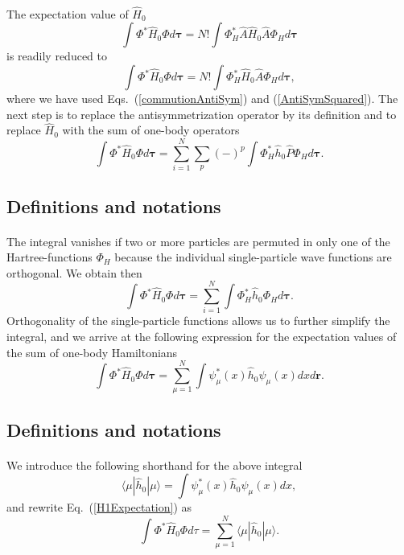 \documentclass[%
twoside,                 %
final,                   %
10pt]{article}
\begin{document}
\paragraph{}
The expectation value of $\hat{H}_0$ 
\[
  \int \Phi^*\hat{H}_0\Phi d\mathbf{\tau} 
  = N! \int \Phi_H^*\hat{A}\hat{H}_0\hat{A}\Phi_H d\mathbf{\tau}
\]
is readily reduced to
\[
  \int \Phi^*\hat{H}_0\Phi d\mathbf{\tau} 
  = N! \int \Phi_H^*\hat{H}_0\hat{A}\Phi_H d\mathbf{\tau},
\]
where we have used Eqs.~(\ref{commutionAntiSym}) and
(\ref{AntiSymSquared}). The next step is to replace the antisymmetrization
operator by its definition and to
replace $\hat{H}_0$ with the sum of one-body operators
\[
  \int \Phi^*\hat{H}_0\Phi  d\mathbf{\tau}
  = \sum_{i=1}^N \sum_{p} (-)^p\int 
  \Phi_H^*\hat{h}_0\hat{P}\Phi_H d\mathbf{\tau}.
\]



\subsection*{Definitions and notations}

\paragraph{}
The integral vanishes if two or more particles are permuted in only one
of the Hartree-functions $\Phi_H$ because the individual single-particle wave functions are
orthogonal. We obtain then
\[
  \int \Phi^*\hat{H}_0\Phi  d\mathbf{\tau}= \sum_{i=1}^N \int \Phi_H^*\hat{h}_0\Phi_H  d\mathbf{\tau}.
\]
Orthogonality of the single-particle functions allows us to further simplify the integral, and we
arrive at the following expression for the expectation values of the
sum of one-body Hamiltonians 
\begin{equation}
  \int \Phi^*\hat{H}_0\Phi  d\mathbf{\tau}
  = \sum_{\mu=1}^N \int \psi_{\mu}^*(x)\hat{h}_0\psi_{\mu}(x)dx
  d\mathbf{r}.
  \label{H1Expectation}
\end{equation}



\subsection*{Definitions and notations}

\paragraph{}
We introduce the following shorthand for the above integral
\[
\langle \mu | \hat{h}_0 | \mu \rangle = \int \psi_{\mu}^*(x)\hat{h}_0\psi_{\mu}(x)dx,
\]
and rewrite Eq.~(\ref{H1Expectation}) as
\begin{equation}
  \int \Phi^*\hat{H}_0\Phi  d\tau
  = \sum_{\mu=1}^N \langle \mu | \hat{h}_0 | \mu \rangle.
  \label{H1Expectation1}
\end{equation}
\end{document}
